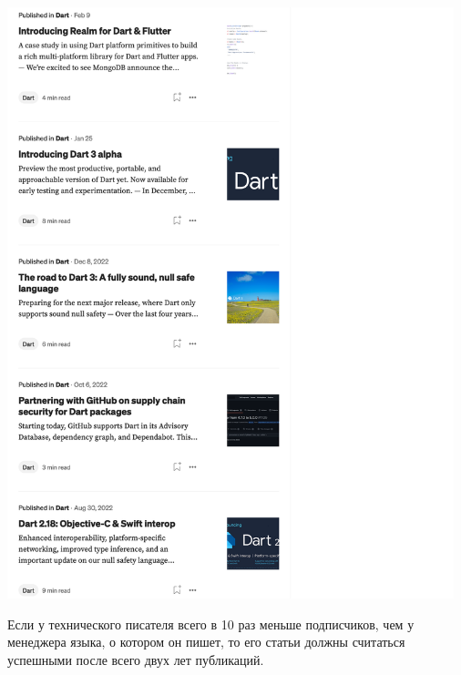 \Continuing
\begin{center}
    \includegraphics[width=35em]{thomsen-followers-p2}
\end{center}

Если у технического писателя всего в 10 раз меньше подписчиков, чем у менеджера языка,
о котором он пишет, то его статьи должны считаться успешными после всего двух лет публикаций.

\pagebreak
